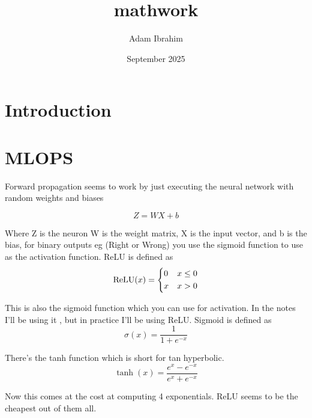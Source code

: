 \documentclass{article}
\title{mathwork}
\author{Adam Ibrahim}
\date{September 2025}
\begin{document}
\maketitle

\section{Introduction}
\section{MLOPS}
\par{Forward propagation seems to work by just executing the neural network with random weights and biases}

$$ Z=WX+b$$
\par {Where Z is the neuron W is the weight matrix, X is the input vector, and b is the bias, for binary outputs eg (Right or Wrong) you use the sigmoid function to use as the activation function. ReLU is defined as}
$$\text{ReLU}(x) = \begin{dcases}0 & x\leq0 \\ x & x > 0\end{dcases}$$
\par{This is also the sigmoid function which you can use for activation. In the notes I'll be using it
, but in practice I'll be using ReLU. Sigmoid is defined as}
$$\sigma(x) = \frac{1}{1+e^{-x}}$$
\par{There's the tanh function which is short for tan hyperbolic.}
$$\tanh(x) = \frac{e^x-e^{-x}}{e^x+e^{-x}}$$
\par{Now this comes at the cost at computing 4 exponentials. ReLU seems to be the 
cheapest out of them all.}\\
\end{document}

